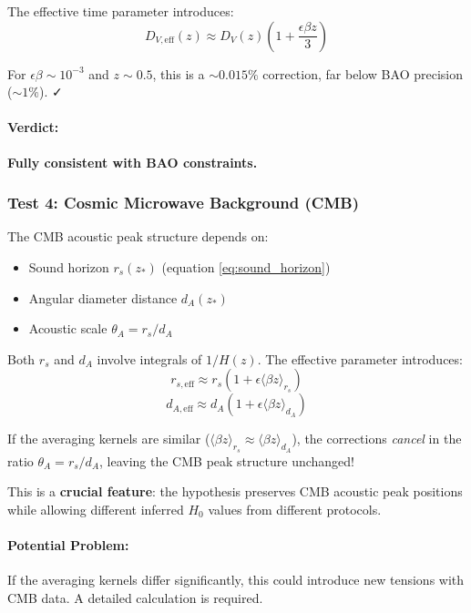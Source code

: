 The effective time parameter introduces:
\begin{equation}
D_{V,\text{eff}}(z) \approx D_V(z) \left(1 + \frac{\epsilon \beta z}{3}\right)
\label{eq:dv_eff}
\end{equation}

For $\epsilon \beta \sim 10^{-3}$ and $z \sim 0.5$, this is a $\sim 0.015\%$ correction, far below BAO precision ($\sim 1\%$). ✓

\paragraph{Verdict:} \textbf{Fully consistent with BAO constraints.}

\subsubsection{Test 4: Cosmic Microwave Background (CMB)}

The CMB acoustic peak structure depends on:
\begin{itemize}
    \item Sound horizon $r_s(z_*)$ (equation \ref{eq:sound_horizon})
    \item Angular diameter distance $d_A(z_*)$
    \item Acoustic scale $\theta_A = r_s/d_A$
\end{itemize}

Both $r_s$ and $d_A$ involve integrals of $1/H(z)$. The effective parameter introduces:
\begin{equation}
r_{s,\text{eff}} \approx r_s \left(1 + \epsilon \langle \beta z \rangle_{r_s}\right)
\label{eq:rs_eff}
\end{equation}
\begin{equation}
d_{A,\text{eff}} \approx d_A \left(1 + \epsilon \langle \beta z \rangle_{d_A}\right)
\label{eq:da_eff}
\end{equation}

If the averaging kernels are similar ($\langle \beta z \rangle_{r_s} \approx \langle \beta z \rangle_{d_A}$), the corrections \textit{cancel} in the ratio $\theta_A = r_s/d_A$, leaving the CMB peak structure unchanged!

This is a \textbf{crucial feature}: the hypothesis preserves CMB acoustic peak positions while allowing different inferred $H_0$ values from different protocols.

\paragraph{Potential Problem:} If the averaging kernels differ significantly, this could introduce new tensions with CMB data. A detailed calculation is required.

